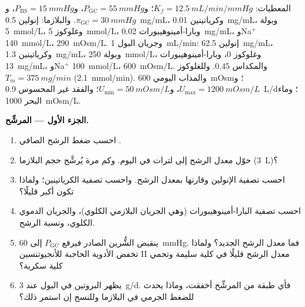 \begin{problem}
\label{pb:b3:renal-osmoregulation:1}
المعطيات: $K_{f} = \qty{12.5}{mL/min/mmHg}$؛ و$P_{\text{GC}} = \qty{55}{mmHg}$،
و$P_{\text{BS}} = \qty{15}{mmHg}$، و$\pi_{\text{GC}} = \qty{30}{mmHg}$.
والبلازما: إنولين \qty{0.5}{mg/mL}، وكرياتينين \qty{0.01}{mg/mL}،
وبولة \qty{5}{mmol/L}، وغلوكوز \qty{5}{mmol/L}، وبارا-أمينوهيبورات
\qty{0.02}{mg/mL}، وNa$^{+}$ \qty{140}{mmol/L}، 
\qty{290}{mOsm/L}. وجريان البول \qty{1}{mL/min}: إنولين \qty{62.5}{mg/mL}،
وكرياتينين \qty{1.3}{mg/mL}، وبولة \qty{250}{mmol/L}، وغلوكوز $0$،
وبارا-أمينوهيبورات \qty{13}{mg/mL}، وNa$^{+}$ \qty{100}{mmol/L}،
 \qty{600}{mOsm/L}. والمكداس $0.45$. وللغلوكوز $T_{m} =
\qty{375}{mg/min}$ (\qty{2.1}{mmol/min}). والمذاب اليومي \qty{600}{mOsm}؛
و$U_{\max} = \qty{1200}{mOsm/L}$، و$U_{\min} = \qty{50}{mOsm/L}$؛
والفقد غير المحسوس \qty{0.9}{L/d}؛ وماء البحر \qty{1000}{mOsm/L}.

\medskip
\noindent\textbf{الجزء الأول --- المرشِّح.}
\begin{enumerate}
  \item احسب ضغط الرشح الصافي .
  \item حوّل معدل الرشح إلى لترات في اليوم. وكم مرة يُرشَّح حجم
        البلازما (\qty{3}{L})؟
  \item احسب تصفية الإنولين وقارنها بمعدل الرشح. واحسب تصفية
        الكرياتينين؛ ولماذا تكون أكبر قليلًا؟
  \item احسب تصفية البارا-أمينوهيبورات (وهي الجريان البلازمي
        الكلوي)، والجريان الدموي الكلوي، ونسبة الرشح.
  \item ينقبض الشُّرين الصادر فيرفع $P_{\text{GC}}$ إلى
        \qty{60}{mmHg}. فما معدل الرشح الجديد؟ ولماذا تخفض
        الأدوية الحاجبة للأنجيوتنسين II معدل الرشح قليلًا في
        كلية سليمة وتحمي كلية سكرية؟
  \item يظهر البروتين في البول عند \qty{3}{g/d}. فأي طبقة من
        المرشِّح أخفقت، وماذا يحدث للضغط الجرمي في البلازما
        وللنسج إن استمر ذلك؟
\end{enumerate}


\end{problem}
